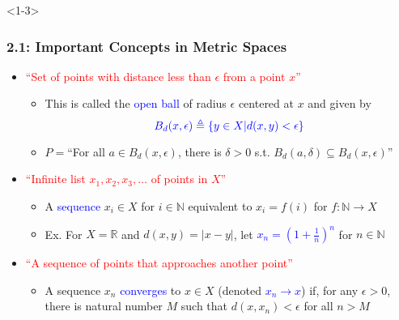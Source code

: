 \documentclass[10pt,english,aspectratio=169]{beamer}
\begin{document}
\begin{frame}<1-3> \frametitle{2.1: Important Concepts in Metric Spaces}

\begin{itemize}
\setlength\itemsep{5mm}
\item<1-> \textcolor{red}{``Set of points with distance less than $\epsilon$ from a point $x$''} \vspace{1mm}
\begin{itemize} 
  \setlength\itemsep{1.5mm}
  \item This is called the \textcolor{blue}{open ball} of radius $\epsilon$ centered at $x$ and given by \vspace{-1mm} \[\color{blue} B_d(x,\epsilon) \triangleq \left\{ y \in X | d(x,y) < \epsilon \right\} \vspace{-5mm} \]
  \item $P=$``For all $a\!\in\! B_d (x,\epsilon)$, there is $\delta\!>\!0$ s.t. $B_d (a,\delta) \subseteq B_d (x,\epsilon)$''
\end{itemize}

\item<2-> \textcolor{red}{``Infinite list $x_1,x_2,x_3,\ldots$ of points in $X$''} \vspace{1mm}
\begin{itemize} 
  \setlength\itemsep{1.5mm}
  \item A \textcolor{blue}{sequence} $x_i \in X$ for $i\in \mathbb{N}$ equivalent to $x_i = f(i)$ for $f:\mathbb{N}\to X$
  \item Ex. For $X=\mathbb{R}$ and $d(x,y)=|x-y|$, let \textcolor{blue}{$x_n = \left(1+\frac{1}{n}\right)^n$} for $n\in \mathbb{N}$
\end{itemize}

\item<3-> \textcolor{red}{``A sequence of points that approaches another point''} \vspace{1mm}
\begin{itemize} 
  \setlength\itemsep{1.5mm}
  \item A sequence $x_n$ \textcolor{blue}{converges} to $x\in X$ (denoted \textcolor{blue}{$x_n \to x$})  if, for any $\epsilon >0$, there is natural number $M$ such that $d(x,x_n) < \epsilon$ for all $n>M$
\end{itemize}
  
\end{itemize}


\end{frame}
\end{document}
